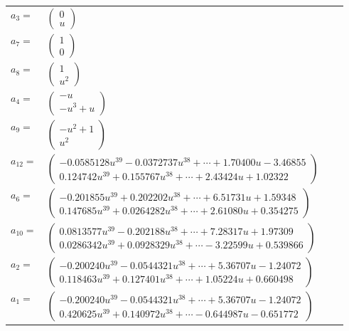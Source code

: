 \documentclass[1p]{elsarticle_modified}
\theoremstyle{definition}
\begin{document}
\begin{tabular}{m{7pt} m{180pt} m{7pt} m{180pt} }
\flushright $a_{3}=$&$\begin{pmatrix}0\\u\end{pmatrix}$ \\
\flushright $a_{7}=$&$\begin{pmatrix}1\\0\end{pmatrix}$ \\
\flushright $a_{8}=$&$\begin{pmatrix}1\\u^2\end{pmatrix}$ \\
\flushright $a_{4}=$&$\begin{pmatrix}- u\\- u^3+u\end{pmatrix}$ \\
\flushright $a_{9}=$&$\begin{pmatrix}- u^2+1\\u^2\end{pmatrix}$ \\
\flushright $a_{12}=$&$\begin{pmatrix}-0.0585128 u^{39}-0.0372737 u^{38}+\cdots+1.70400 u-3.46855\\0.124742 u^{39}+0.155767 u^{38}+\cdots+2.43424 u+1.02322\end{pmatrix}$ \\
\flushright $a_{6}=$&$\begin{pmatrix}-0.201855 u^{39}+0.202202 u^{38}+\cdots+6.51731 u+1.59348\\0.147685 u^{39}+0.0264282 u^{38}+\cdots+2.61080 u+0.354275\end{pmatrix}$ \\
\flushright $a_{10}=$&$\begin{pmatrix}0.0813577 u^{39}-0.202188 u^{38}+\cdots+7.28317 u+1.97309\\0.0286342 u^{39}+0.0928329 u^{38}+\cdots-3.22599 u+0.539866\end{pmatrix}$ \\
\flushright $a_{2}=$&$\begin{pmatrix}-0.200240 u^{39}-0.0544321 u^{38}+\cdots+5.36707 u-1.24072\\0.118463 u^{39}+0.127401 u^{38}+\cdots+1.05224 u+0.660498\end{pmatrix}$ \\
\flushright $a_{1}=$&$\begin{pmatrix}-0.200240 u^{39}-0.0544321 u^{38}+\cdots+5.36707 u-1.24072\\0.420625 u^{39}+0.140972 u^{38}+\cdots-0.644987 u-0.651772\end{pmatrix}$ \\

\end{tabular}
\end{document}
